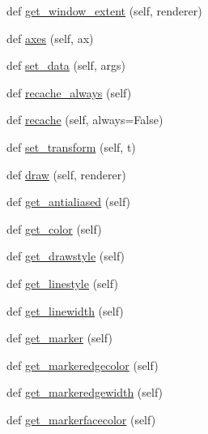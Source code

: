 \begin{DoxyCompactItemize}
\item 
def \hyperlink{classmatplotlib_1_1lines_1_1Line2D_aee233d547a08776f91ac3149c771b9c3}{get\+\_\+window\+\_\+extent} (self, renderer)
\item 
def \hyperlink{classmatplotlib_1_1lines_1_1Line2D_a493458ea1459a739b91071ce87c0fdc1}{axes} (self, ax)
\item 
def \hyperlink{classmatplotlib_1_1lines_1_1Line2D_ae1d3608629a68c73865cfed1709eab8b}{set\+\_\+data} (self, args)
\item 
def \hyperlink{classmatplotlib_1_1lines_1_1Line2D_a6d4a6d068b78e2410405f3b2442d02d4}{recache\+\_\+always} (self)
\item 
def \hyperlink{classmatplotlib_1_1lines_1_1Line2D_a73e3bbe50b6a7c0fc3aca521372080b5}{recache} (self, always=False)
\item 
def \hyperlink{classmatplotlib_1_1lines_1_1Line2D_a30010a533d5d6a2650ac6e039409fb83}{set\+\_\+transform} (self, t)
\item 
def \hyperlink{classmatplotlib_1_1lines_1_1Line2D_a100d266c9e4a70461353b16d3f7c8d91}{draw} (self, renderer)
\item 
def \hyperlink{classmatplotlib_1_1lines_1_1Line2D_a5e89b1a6c04888fccb97ec3b72d2862a}{get\+\_\+antialiased} (self)
\item 
def \hyperlink{classmatplotlib_1_1lines_1_1Line2D_a64e438e116610f46efc4788fb6a56a5e}{get\+\_\+color} (self)
\item 
def \hyperlink{classmatplotlib_1_1lines_1_1Line2D_ac72b577db0ef2add33d3eba368396f2d}{get\+\_\+drawstyle} (self)
\item 
def \hyperlink{classmatplotlib_1_1lines_1_1Line2D_a0c06d11c3314bfd3b0e1fad37292d3c0}{get\+\_\+linestyle} (self)
\item 
def \hyperlink{classmatplotlib_1_1lines_1_1Line2D_af33bf3fa2eec1a81d08ce1417f38a17d}{get\+\_\+linewidth} (self)
\item 
def \hyperlink{classmatplotlib_1_1lines_1_1Line2D_a43ec184416db444f0821f92867c4af33}{get\+\_\+marker} (self)
\item 
def \hyperlink{classmatplotlib_1_1lines_1_1Line2D_a3450d5106e4271574334e4ae87118d1a}{get\+\_\+markeredgecolor} (self)
\item 
def \hyperlink{classmatplotlib_1_1lines_1_1Line2D_aef66019250010d7dee8ce0083e52a2c8}{get\+\_\+markeredgewidth} (self)
\item 
def \hyperlink{classmatplotlib_1_1lines_1_1Line2D_acfca71a1b77a8b37b914c5fd9925f24a}{get\+\_\+markerfacecolor} (self)
\item 

\end{DoxyCompactItemize}
